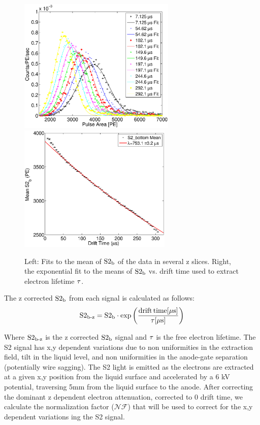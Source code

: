 \begin{figure}[h!]\centering
\includegraphics[width=75mm]{Chapter_XYZ_Corr/Thesis_Corr_Plots/S2_bottom_hist_EL.eps}
\includegraphics[width=73mm]{Chapter_XYZ_Corr/Thesis_Corr_Plots/S2_bottom_lifetime.eps}
\caption{Left: Fits to the mean of $\rm S2_b$ of the \KrCal data in several z slices. Right, the exponential fit to the means of $\rm S2_b$ vs. drift time used to extract electron lifetime $\rm \tau$. }
\label{fig:S2_EL}
\end{figure}

The z corrected $\rm S2_b$ from each signal is calculated as follows:
\begin{equation}
\rm S2_{\operatorname{b-z}}=S2_b\cdot exp\left(\frac{drift\,time[\mu s]}{\tau[\mu s]}\right)
\label{eq:S2_Z}
\end{equation}

\noindent Where $\rm S2_{\operatorname{b-z}}$ is the z corrected $\rm S2_b$ signal and $\rm \tau$ is the free electron lifetime. The S2 signal has x,y dependent variations due to non uniformities in the extraction field, tilt in the liquid level, and non uniformities in the anode-gate separation (potentially wire sagging). The S2 light is emitted as the electrons are extracted at a given x,y position from the liquid surface and accelerated by a 6 kV potential, traversing 5mm from the liquid surface to the anode. After correcting the dominant z dependent electron attenuation, corrected to 0 drift time, we calculate the normalization factor ($\mathcal{NF}$) that will be used to correct for the x,y dependent variations ing the S2 signal.

